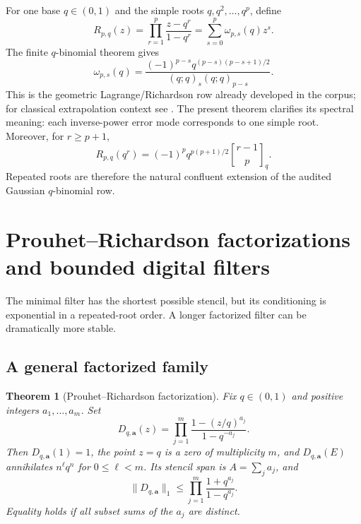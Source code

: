 \documentclass[11pt,oneside]{article}
\numberwithin{equation}{section}
\newtheorem{theorem}{Theorem}[section]
\theoremstyle{definition}
\theoremstyle{remark}
\newcommand{\qbinom}[3]{\genfrac{[}{]}{0pt}{}{#1}{#2}_{#3}}
\begin{document}
For one base $q\in(0,1)$ and the simple roots $q,q^2,\ldots,q^p$, define
\begin{equation}
 R_{p,q}(z)=\prod_{r=1}^{p}\frac{z-q^r}{1-q^r}
 =\sum_{s=0}^{p}\omega_{p,s}(q)z^s.
 \label{eq:q-richardson-poly}
\end{equation}
The finite $q$-binomial theorem gives
\begin{equation}
 \boxed{
 \omega_{p,s}(q)
 =\frac{(-1)^{p-s}q^{(p-s)(p-s+1)/2}}
 {(q;q)_s(q;q)_{p-s}}.}
 \label{eq:q-richardson-weights}
\end{equation}
This is the geometric Lagrange/Richardson row already developed in the corpus; for
classical extrapolation context see \cite{sidi2006}.  The
present theorem clarifies its spectral meaning: each inverse-power error mode corresponds
to one simple root.  Moreover, for $r\ge p+1$,
\begin{equation}
 R_{p,q}(q^r)
 =(-1)^pq^{p(p+1)/2}\qbinom{r-1}{p}{q}.
 \label{eq:q-moment-transform}
\end{equation}
Repeated roots are therefore the natural confluent extension of the audited Gaussian
$q$-binomial row.

\section{Prouhet--Richardson factorizations and bounded digital filters}
\label{sec:digital}

The minimal filter has the shortest possible stencil, but its conditioning is exponential
in a repeated-root order.  A longer factorized filter can be dramatically more stable.

\subsection{A general factorized family}

\begin{theorem}[Prouhet--Richardson factorization]
\label{thm:general-digital}
Fix $q\in(0,1)$ and positive integers $a_1,\ldots,a_m$.  Set
\begin{equation}
 D_{q,\bm a}(z)
 =\prod_{j=1}^{m}
 \frac{1-(z/q)^{a_j}}{1-q^{-a_j}}.
 \label{eq:general-digital-filter}
\end{equation}
Then $D_{q,\bm a}(1)=1$, the point $z=q$ is a zero of multiplicity $m$, and
$D_{q,\bm a}(E)$ annihilates $n^\ell q^n$ for $0\le\ell<m$.  Its stencil span is
$A=\sum_ja_j$, and
\begin{equation}
 \|D_{q,\bm a}\|_1
 \le\prod_{j=1}^{m}\frac{1+q^{a_j}}{1-q^{a_j}}.
 \label{eq:general-digital-condition}
\end{equation}
Equality holds if all subset sums of the $a_j$ are distinct.
\end{theorem}
\end{document}
